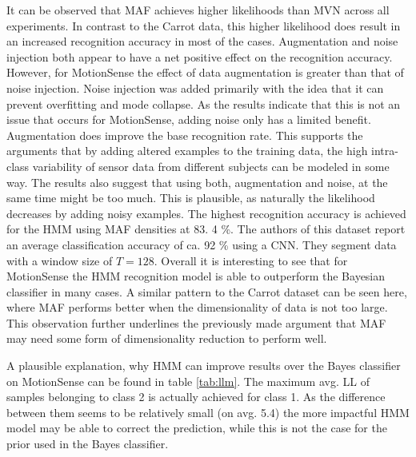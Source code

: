 \documentclass[11pt,titlepage,oneside,openany]{book}
\begin{document}
\noindent It can be observed that MAF achieves higher likelihoods than MVN across all experiments. In contrast to the Carrot data, this higher likelihood does result in an increased recognition accuracy in most of the cases. Augmentation and noise injection both appear to have a net positive effect on the recognition accuracy. However, for MotionSense the effect of data augmentation is greater than that of noise injection. Noise injection was added primarily with the idea that it can prevent overfitting and mode collapse. As the results indicate that this is not an issue that occurs for MotionSense, adding noise only has a limited benefit. Augmentation does improve the base recognition rate. This supports the arguments that by adding altered examples to the training data, the high intra-class variability of sensor data from different subjects can be modeled in some way. The results also suggest that using both, augmentation and noise, at the same time might be too much. This is plausible, as naturally the likelihood decreases by adding noisy examples. The highest recognition accuracy is achieved for the HMM using MAF densities at 83. 4 \%. The authors of this dataset report an average classification accuracy of ca. 92 \% \cite{malekzadeh_mobile_2019} using a CNN. They segment data with a window size of $T=128$. Overall it is interesting to see that for MotionSense the HMM recognition model is able to outperform the Bayesian classifier in many cases. A similar pattern to the Carrot dataset can be seen here, where MAF performs better when the dimensionality of data is not too large. This observation further underlines the previously made argument that MAF may need some form of dimensionality reduction to perform well.

A plausible explanation, why HMM can improve results over the Bayes classifier on MotionSense can be found in table \ref{tab:llm}. The maximum avg. LL of samples belonging to class 2 is actually achieved for class 1. As the difference between them seems to be relatively small (on avg. 5.4) the more impactful HMM model may be able to correct the prediction, while this is not the case for the prior used in the Bayes classifier.
\end{document}
